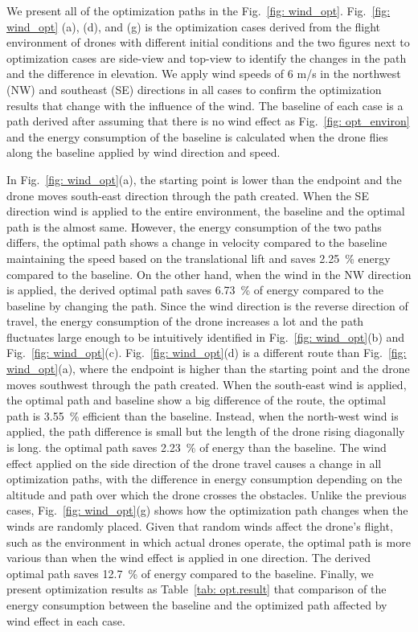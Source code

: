 \documentclass[journal]{./template/IEEEtran}
\begin{document}
We present all of the optimization paths in the Fig.~\ref{fig: wind_opt}. 
Fig.~\ref{fig: wind_opt} (a), (d), and (g) is the optimization cases derived from the flight environment of drones with different initial conditions and the two figures next to optimization cases are side-view and top-view to identify the changes in the path and the difference in elevation. 
We apply wind speeds of 6 m/s in the northwest (NW) and southeast (SE) directions in all cases to confirm the optimization results that change with the influence of the wind.
The baseline of each case is a path derived after assuming that there is no wind effect as Fig.~\ref{fig: opt_environ} and the energy consumption of the baseline is calculated when the drone flies along the baseline applied by wind direction and speed.

In Fig.~\ref{fig: wind_opt}(a), the starting point is lower than the endpoint and the drone moves south-east direction through the path created. 
When the SE direction wind is applied to the entire environment, the baseline and the optimal path is the almost same.
However, the energy consumption of the two paths differs, the optimal path shows a change in velocity compared to the baseline maintaining the speed based on the translational lift and saves 2.25~\% energy compared to the baseline.
On the other hand, when the wind in the NW direction is applied, the derived optimal path saves 6.73~\% of energy compared to the baseline by changing the path.
Since the wind direction is the reverse direction of travel, the energy consumption of the drone increases a lot and the path fluctuates large enough to be intuitively identified in Fig.~\ref{fig: wind_opt}(b) and Fig.~\ref{fig: wind_opt}(c).  
Fig.~\ref{fig: wind_opt}(d) is a different route than Fig.~\ref{fig: wind_opt}(a), where the endpoint is higher than the starting point and the drone moves southwest through the path created. When the south-east wind is applied, the optimal path and baseline show a big difference of the route, the optimal path is 3.55~\% efficient than the baseline.
Instead, when the north-west wind is applied, the path difference is small but the length of the drone rising diagonally is long. the optimal path saves 2.23~\% of energy than the baseline.
The wind effect applied on the side direction of the drone travel causes a change in all optimization paths, with the difference in energy consumption depending on the altitude and path over which the drone crosses the obstacles.
Unlike the previous cases, Fig.~\ref{fig: wind_opt}(g) shows how the optimization path changes when the winds are randomly placed.
Given that random winds affect the drone's flight, such as the environment in which actual drones operate, the optimal path is more various than when the wind effect is applied in one direction.
The derived optimal path saves 12.7~\% of energy compared to the baseline. 
Finally, we present optimization results as Table~\ref{tab: opt.result} that comparison of the energy consumption between the baseline and the optimized path affected by wind effect in each case.
\end{document}
